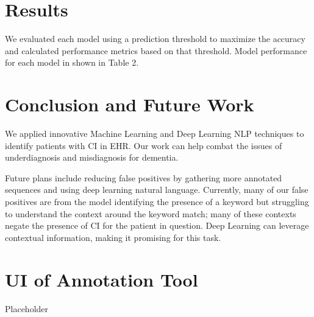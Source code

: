 \documentclass[pmlr,twocolumn,10pt]{jmlr} %
\begin{document}
\section{Results}
\label{sec:Results}  


We evaluated each model using a prediction threshold to maximize the accuracy and calculated performance metrics based on that threshold. Model performance for each model in shown in Table 2. 

\section{Conclusion and Future Work} 
\label{sec:ConclusionFutureWork} We applied innovative Machine Learning and Deep Learning NLP techniques to identify patients with CI in EHR. Our work can help combat the issues of underdiagnosis and misdiagnosis for dementia. 

Future plans include reducing false positives by gathering more annotated sequences and using deep learning natural language. Currently, many of our false positives are from the model identifying the presence of a keyword but struggling to understand the context around the keyword match; many of these contexts negate the presence of CI for the patient in question. Deep Learning can leverage contextual information, making it promising for this task.

\clearpage
\appendix

\section{UI of Annotation Tool}
Placeholder

\end{document}
